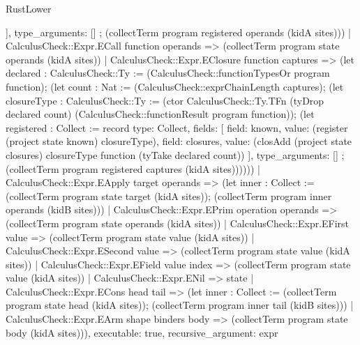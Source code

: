 \begin{lexlean}{RustLower}
\begin{semanticmodule}
{{      ],
      type_arguments: []
    }; (collectTerm program registered operands (kidA sites)))
    | CalculusCheck::Expr.ECall function operands => (collectTerm program state operands (kidA sites))
    | CalculusCheck::Expr.EClosure function captures => (let declared : CalculusCheck::Ty := (CalculusCheck::functionTypesOr program function); (let count : Nat := (CalculusCheck::exprChainLength captures); (let closureType : CalculusCheck::Ty := (ctor CalculusCheck::Ty.TFn (tyDrop declared count) (CalculusCheck::functionResult program function)); (let registered : Collect := record{
      type: Collect,
      fields: [
        {field: known, value: (register (project state known) closureType)},
        {
          field: closures,
          value: (closAdd (project state closures) closureType function (tyTake declared count))
        }
      ],
      type_arguments: []
    }; (collectTerm program registered captures (kidA sites))))))
    | CalculusCheck::Expr.EApply target operands => (let inner : Collect := (collectTerm program state target (kidA sites)); (collectTerm program inner operands (kidB sites)))
    | CalculusCheck::Expr.EPrim operation operands => (collectTerm program state operands (kidA sites))
    | CalculusCheck::Expr.EFirst value => (collectTerm program state value (kidA sites))
    | CalculusCheck::Expr.ESecond value => (collectTerm program state value (kidA sites))
    | CalculusCheck::Expr.EField value index => (collectTerm program state value (kidA sites))
    | CalculusCheck::Expr.ENil => state
    | CalculusCheck::Expr.ECons head tail => (let inner : Collect := (collectTerm program state head (kidA sites)); (collectTerm program inner tail (kidB sites)))
    | CalculusCheck::Expr.EArm shape binders body => (collectTerm program state body (kidA sites))),
  executable: true,
  recursive_argument: expr
}


\end{semanticmodule}
\end{lexlean}
